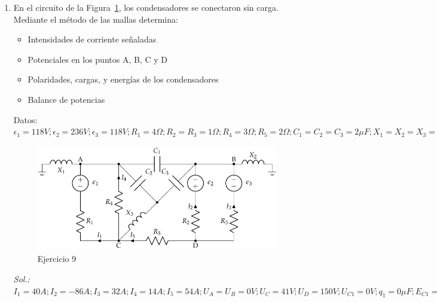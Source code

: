 \begin{enumerate}
\item En el circuito de la Figura~\ref{fig.mallas_condensadores}, los condensadores se conectaron sin
carga. Mediante el método de las mallas determina:
\begin{itemize}
\item Intensidades de corriente señaladas
\item Potenciales en los puntos A, B, C y D
\item Polaridades, cargas, y energías de los condensadores
\item Balance de potencias
\end{itemize}
Datos: $ \epsilon_{1}={118}V; \epsilon_{2}={236} V; \epsilon_{3}=118V; R_{1}= {4}\Omega; R_{2}=R_{3}={1}{\Omega}; R_{4}= {3}{\Omega}; R_{5}={2}{\Omega}; C_{1}=C_{2}=C_{3}={2}{\mu F}; X_1 = X_2 = X_3 = {1}{\Omega}$
\begin{figure}[H]
        \centering
        \includegraphics{../figs/mallas_condensadores.pdf}
        \caption{Ejercicio 9}
        \label{fig.mallas_condensadores}
    \end{figure}
    \emph{Sol.: $I_1=40A; I_2=-86A; I_3=32A; I_4=14A; I_5=54A; U_A=U_B=0V; U_C=41V; U_D=150V; U_{C1}=0V; q_1=0\mu F; E_{C1}=0J; U_{C2}=-42V; q_2=84\mu F; E_{C2}=1.76 mJ; U_{C3}=-42V; q_3=84\mu F; E_{C3}=1.76 mJ; \sum P = 0$}


\end{enumerate}
